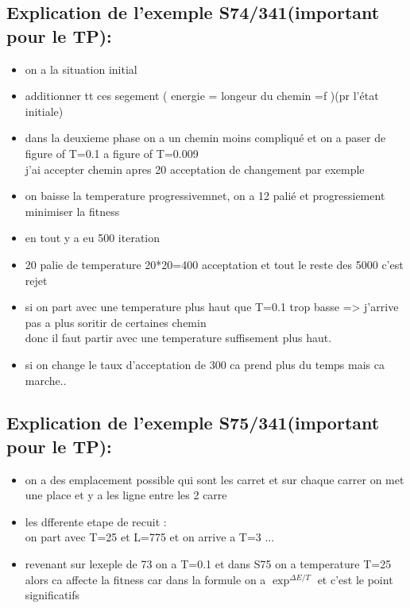 \subsection*{Explication de l'exemple S74/341(important pour le TP):}
\begin{itemize}

\item on a la situation initial
\item additionner tt ces segement ( energie = longeur du chemin =f )(pr l'\'etat initiale)
\item dans la deuxieme phase on a un chemin moins compliqu\'e et on a paser de figure of T=0.1 a figure of  T=0.009 \\
	j'ai accepter chemin apres 20 acceptation de changement par exemple
	\item on baisse la temperature progressivemnet, on a 12 pali\'e  et progressiement minimiser la fitness 
	\item en tout y a eu 500 iteration 
	\item 20 palie de temperature 20*20=400 acceptation et tout le reste des 5000 c'est rejet
	\item si on part avec une temperature plus haut que  T=0.1 trop basse => j'arrive pas a plus soritir de certaines chemin \\
	donc il faut partir avec une temperature suffisement plus haut.
	\item si on change le taux d'acceptation de 300 ca prend plus du temps mais ca marche..

\end{itemize}
\subsection*{Explication de l'exemple S75/341(important pour le TP):}
\begin{itemize}

\item on a des emplacement possible qui sont les carret et sur chaque carrer on met une place et y a les ligne entre les 2 carre
\item les dfferente etape de recuit :\\on part avec T=25 et L=775 et on arrive a T=3 ...

\item revenant sur lexeple de 73 on a T=0.1 et dans S75 on a temperature T=25
alors ca affecte la fitness car dans la formule on a $\exp^{\Delta E/ T}$ et c'est le point significatifs
\end{itemize} 

